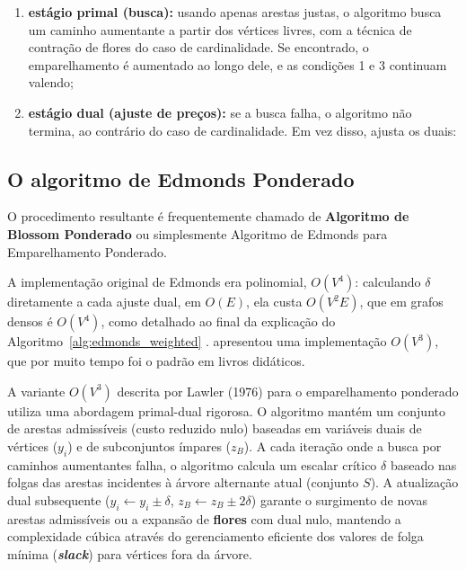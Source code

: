 \begin{enumerate}
    \item \textbf{estágio primal (busca):} usando apenas arestas justas, o algoritmo busca um caminho aumentante a partir dos vértices livres, com a técnica de contração de flores do caso de cardinalidade. Se encontrado, o emparelhamento é aumentado ao longo dele, e as condições 1 e 3 continuam valendo;
    \item \textbf{estágio dual (ajuste de preços):} se a busca falha, o algoritmo não termina, ao contrário do caso de cardinalidade. Em vez disso, ajusta os duais:
\end{enumerate}

\subsection{O algoritmo de Edmonds Ponderado}

O procedimento resultante é frequentemente chamado de \textbf{Algoritmo de Blossom Ponderado} ou simplesmente Algoritmo de Edmonds para Emparelhamento Ponderado.

A implementação original de Edmonds era polinomial, $O(V^4)$: calculando $\delta$ diretamente a cada ajuste dual, em $O(E)$, ela custa $O(V^2 E)$, que em grafos densos é $O(V^4)$, como detalhado ao final da explicação do Algoritmo~\ref{alg:edmonds_weighted} \cite{galil_micali_gabow}.  apresentou uma implementação $O(V^3)$, que por muito tempo foi o padrão em livros didáticos.

A variante $O(V^3)$ descrita por Lawler (1976) para o emparelhamento ponderado utiliza uma abordagem primal-dual rigorosa. O algoritmo mantém um conjunto de arestas admissíveis (custo reduzido nulo) baseadas em variáveis duais de vértices ($y_i$) e de subconjuntos ímpares ($z_B$). A cada iteração onde a busca por caminhos aumentantes falha, o algoritmo calcula um escalar crítico $\delta$ baseado nas folgas das arestas incidentes à árvore alternante atual (conjunto $S$). A atualização dual subsequente ($y_i \leftarrow y_i \pm \delta$, $z_B \leftarrow z_B \pm 2\delta$) garante o surgimento de novas arestas admissíveis ou a expansão de \textbf{flores} com dual nulo, mantendo a complexidade cúbica através do gerenciamento eficiente dos valores de folga mínima (\textbf{\textit{slack}}) para vértices fora da árvore.

